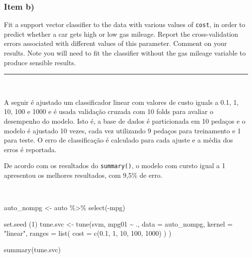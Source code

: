 \documentclass[
  a4paperpaper,
]{article}
\newenvironment{Shaded}{\begin{snugshade}}{\end{snugshade}}
\newcommand{\AttributeTok}[1]{\textcolor[rgb]{0.40,0.45,0.13}{#1}}
\newcommand{\DecValTok}[1]{\textcolor[rgb]{0.68,0.00,0.00}{#1}}
\newcommand{\FloatTok}[1]{\textcolor[rgb]{0.68,0.00,0.00}{#1}}
\newcommand{\FunctionTok}[1]{\textcolor[rgb]{0.28,0.35,0.67}{#1}}
\newcommand{\NormalTok}[1]{\textcolor[rgb]{0.00,0.23,0.31}{#1}}
\newcommand{\OtherTok}[1]{\textcolor[rgb]{0.00,0.23,0.31}{#1}}
\newcommand{\SpecialCharTok}[1]{\textcolor[rgb]{0.37,0.37,0.37}{#1}}
\newcommand{\StringTok}[1]{\textcolor[rgb]{0.13,0.47,0.30}{#1}}
\begin{document}
\subsubsection{Item b)}\label{item-b-4}

Fit a support vector classifier to the data with various values of
\texttt{cost}, in order to predict whether a car gets high or low gas
mileage. Report the cross-validation errors associated with different
values of this parameter. Comment on your results. Note you will need to
fit the classifier without the gas mileage variable to produce sensible
results.

\begin{center}\rule{0.5\linewidth}{0.5pt}\end{center}

~

A seguir é ajustado um classificador linear com valores de custo iguals
a 0.1, 1, 10, 100 e 1000 e é usada validação cruzada com 10 folds para
avaliar o desempenho do modelo. Isto é, a base de dados é particionada
em 10 pedaços e o modelo é ajustado 10 vezes, cada vez utilizando 9
pedaços para treinamento e 1 para teste. O erro de classificação é
calculado para cada ajuste e a média dos erros é reportada.

De acordo com os resultados do \texttt{summary()}, o modelo com cursto
igual a 1 apresentou os melhores resultados, com 9,5\% de erro.

~

\begin{Shaded}
\begin{Highlighting}[]
\NormalTok{auto\_nompg }\OtherTok{\textless{}{-}}\NormalTok{ auto }\SpecialCharTok{\%\textgreater{}\%} \FunctionTok{select}\NormalTok{(}\SpecialCharTok{{-}}\NormalTok{mpg)}

\FunctionTok{set.seed}\NormalTok{ (}\DecValTok{1}\NormalTok{)}
\NormalTok{tune.svc }\OtherTok{\textless{}{-}} \FunctionTok{tune}\NormalTok{(svm, mpg01 }\SpecialCharTok{\textasciitilde{}}\NormalTok{ ., }\AttributeTok{data =}\NormalTok{ auto\_nompg,}
                   \AttributeTok{kernel =} \StringTok{"linear"}\NormalTok{,}
                   \AttributeTok{ranges =} \FunctionTok{list}\NormalTok{(}
                     \AttributeTok{cost =} \FunctionTok{c}\NormalTok{(}\FloatTok{0.1}\NormalTok{, }\DecValTok{1}\NormalTok{, }\DecValTok{10}\NormalTok{, }\DecValTok{100}\NormalTok{, }\DecValTok{1000}\NormalTok{)}
\NormalTok{                   )}
\NormalTok{)}

\FunctionTok{summary}\NormalTok{(tune.svc)}
\end{Highlighting}
\end{Shaded}
\end{document}
